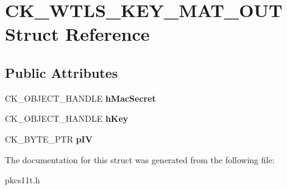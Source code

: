 \hypertarget{struct_c_k___w_t_l_s___k_e_y___m_a_t___o_u_t}{}\section{C\+K\+\_\+\+W\+T\+L\+S\+\_\+\+K\+E\+Y\+\_\+\+M\+A\+T\+\_\+\+O\+UT Struct Reference}
\label{struct_c_k___w_t_l_s___k_e_y___m_a_t___o_u_t}
\subsection*{Public Attributes}
\begin{DoxyCompactItemize}
\item 
\mbox{\label{struct_c_k___w_t_l_s___k_e_y___m_a_t___o_u_t_a00658d76a389d170699973832566b3a3}} 
C\+K\+\_\+\+O\+B\+J\+E\+C\+T\+\_\+\+H\+A\+N\+D\+LE {\bfseries h\+Mac\+Secret}
\item 
\mbox{\label{struct_c_k___w_t_l_s___k_e_y___m_a_t___o_u_t_a75c3f25b467dc7d7d914e858becf5251}} 
C\+K\+\_\+\+O\+B\+J\+E\+C\+T\+\_\+\+H\+A\+N\+D\+LE {\bfseries h\+Key}
\item 
\mbox{\label{struct_c_k___w_t_l_s___k_e_y___m_a_t___o_u_t_a3bd65cceda3c251a13277ac4aef20d07}} 
C\+K\+\_\+\+B\+Y\+T\+E\+\_\+\+P\+TR {\bfseries p\+IV}
\end{DoxyCompactItemize}


The documentation for this struct was generated from the following file\+:\begin{DoxyCompactItemize}
\item 
pkcs11t.\+h\end{DoxyCompactItemize}

